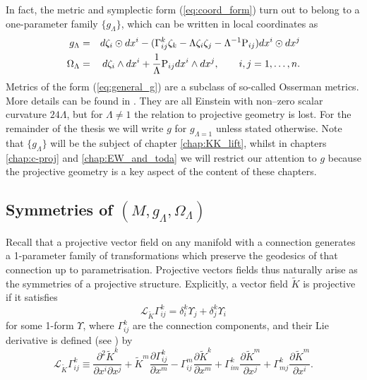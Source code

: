 \begin{rmk}
In fact, the metric and symplectic form (\ref{eq:coord_form}) turn
out to belong to a one-parameter family $\{g_{\Lambda}\}$, which
can be written in local coordinates as 
\begin{eqnarray}
g_{\Lambda} & = &  d\zeta_{i}\odot dx^{i}-(\Gamma_{ij}^{k}\zeta_{k}-\Lambda \zeta_{i}\zeta_{j}-\Lambda^{-1}\mathrm{P}_{ij}) dx^{i}\odot dx^{j}\label{eq:general_g}\\
\Omega_{\Lambda} & = &  d\zeta_{i}\wedge dx^{i}+\frac{1}{\Lambda}\mathrm{P}_{ij} dx^{i}\wedge dx^{j},\qquad i,j=1,\dots ,n.\label{eq:general_omega}
\end{eqnarray}
Metrics of the form (\ref{eq:general_g}) are a subclass of so-called
Osserman metrics. More details can be found in \cite{No-louzao1991}.
They are all Einstein with non--zero scalar curvature $24\Lambda$, but for $\Lambda\neq1$ the relation to projective geometry is lost. For the remainder of the thesis we will write $g$ for $g_{\Lambda=1}$ unless stated otherwise. Note that $\{g_\Lambda\}$ will be the subject of chapter \ref{chap:KK_lift}, whilst in chapters \ref{chap:c-proj} and \ref{chap:EW_and_toda} we will restrict our attention to $g$ because the projective geometry is a key aspect of the content of these chapters.
\end{rmk}



\subsection{Symmetries of $(M,g_{\Lambda},\Omega_{\Lambda})$}

Recall that a projective vector field on any manifold with a connection
generates a 1-parameter family of transformations which preserve the
geodesics of that connection up to parametrisation. Projective vectors
fields thus naturally arise as the symmetries of a projective structure.
Explicitly, a vector field $\tilde{K}$ is projective if it satisfies
\begin{equation}
\mathcal{L}_{\tilde{K}}\Gamma_{ij}^{k}=\delta_{i}^{k}\Upsilon_{j}+\delta_{j}^{k}\Upsilon_{i}\label{eq:proj_transf}
\end{equation}
for some 1-form $\Upsilon$, where $\Gamma_{ij}^{k}$ are the connection
components, and their Lie derivative is defined (see \cite{yano})
by
\begin{equation}
\mathcal{L}_{\tilde{K}}\Gamma_{ij}^{k}\equiv\frac{\partial^{2}\tilde{K}^{k}}{\partial x^{i}\partial x^{j}}+\tilde{K}^{m}\frac{\partial\Gamma_{ij}^{k}}{\partial x^{m}}-\Gamma_{ij}^{m}\frac{\partial \tilde{K}^{k}}{\partial x^{m}}+\Gamma_{im}^{k}\frac{\partial \tilde{K}^{m}}{\partial x^{j}}+\Gamma_{mj}^{k}\frac{\partial \tilde{K}^{m}}{\partial x^{i}}.\label{eq:liederivGamma}
\end{equation}



